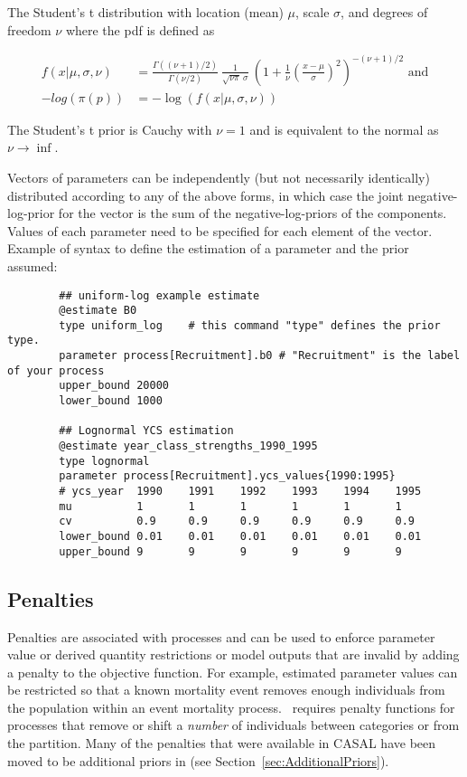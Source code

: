 The Student's t distribution with location (mean) $\mu$, scale $\sigma$, and degrees of freedom $\nu$ where the pdf is defined as

\begin{equation}
	\begin{aligned}
f(x | \mu, \sigma, \nu) &= \frac{\Gamma\left((\nu + 1)/2\right)} {\Gamma(\nu/2)} \ \frac{1}{\sqrt{\nu \pi} \ \sigma} \ \left( 1 + \frac{1}{\nu} \left(\frac{x - \mu}{\sigma}\right)^2 \right)^{-(\nu + 1)/2} \text{ and} \\
- log \left(\pi \left( p \right) \right) &= -\log \left( f(x | \mu, \sigma, \nu) \right)
	\end{aligned}
\end{equation}

The Student's t prior is Cauchy with $\nu = 1$ and is equivalent to the normal as $\nu \rightarrow \inf$.

Vectors of parameters can be independently (but not necessarily identically) distributed according to any of the above forms, in which case the joint negative-log-prior for the vector is the sum of the negative-log-priors of the components. Values of each parameter need to be specified for each element of the vector. Example of syntax to define the estimation of a parameter and the prior assumed:

{\small{\begin{verbatim}
		## uniform-log example estimate
		@estimate B0
		type uniform_log	# this command "type" defines the prior type.
		parameter process[Recruitment].b0 # "Recruitment" is the label of your process
		upper_bound 20000
		lower_bound 1000

		## Lognormal YCS estimation
		@estimate year_class_strengths_1990_1995
		type lognormal
		parameter process[Recruitment].ycs_values{1990:1995}
		# ycs_year  1990	1991	1992	1993	1994	1995
		mu   		1   	1   	1   	1   	1   	1
		cv 			0.9 	0.9 	0.9 	0.9 	0.9 	0.9
		lower_bound 0.01	0.01	0.01	0.01	0.01	0.01
		upper_bound 9		9		9		9		9		9
\end{verbatim}}}

\subsection{Penalties}\label{sec:Penalty}\label{sec:Penalty-Process}

Penalties are associated with processes and can be used to enforce parameter value or derived quantity restrictions or model outputs that are invalid by adding a penalty to the objective function. For example, estimated parameter values can be restricted so that a known mortality event removes enough individuals from the population within an event mortality process. \CNAME\ requires penalty functions for processes that remove or shift a \emph{number} of individuals between categories or from the partition. Many of the penalties that were available in CASAL have been moved to be additional priors in \CNAME (see Section~\ref{sec:AdditionalPriors}).

